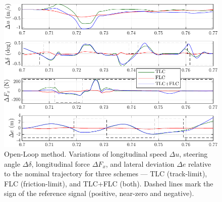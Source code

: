 \begin{figure}[t]
	\centering
	\includegraphics{Fig/ol_telemetries.pdf}
	\caption{Open-Loop method. Variations of longitudinal speed $\Delta u$, steering angle $\Delta\delta$, longitudinal force $\Delta F_x$, and lateral deviation $\Delta e$ relative to the nominal trajectory for three schemes --- TLC (track-limit), FLC (friction-limit), and TLC+FLC (both).
	Dashed lines mark the sign of the reference signal (positive, near-zero and negative).}
	
	\label{fig:ol_telemetries}
\end{figure}

